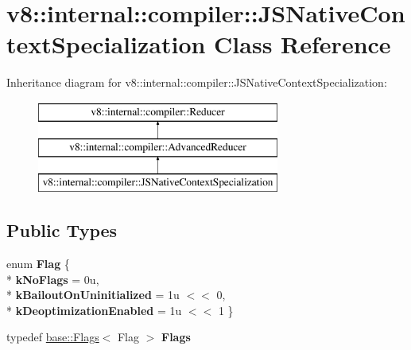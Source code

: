 \hypertarget{classv8_1_1internal_1_1compiler_1_1_j_s_native_context_specialization}{}\section{v8\+:\+:internal\+:\+:compiler\+:\+:J\+S\+Native\+Context\+Specialization Class Reference}
\label{classv8_1_1internal_1_1compiler_1_1_j_s_native_context_specialization}
Inheritance diagram for v8\+:\+:internal\+:\+:compiler\+:\+:J\+S\+Native\+Context\+Specialization\+:\begin{figure}[H]
\begin{center}
\leavevmode
\includegraphics[height=3.000000cm]{classv8_1_1internal_1_1compiler_1_1_j_s_native_context_specialization}
\end{center}
\end{figure}
\subsection*{Public Types}
\begin{DoxyCompactItemize}
\item 
enum {\bfseries Flag} \{ \\*
{\bfseries k\+No\+Flags} = 0u, 
\\*
{\bfseries k\+Bailout\+On\+Uninitialized} = 1u $<$$<$ 0, 
\\*
{\bfseries k\+Deoptimization\+Enabled} = 1u $<$$<$ 1
 \}\hypertarget{classv8_1_1internal_1_1compiler_1_1_j_s_native_context_specialization_ac5300a26368d26f68369e3cacc6d6cc8}{}\label{classv8_1_1internal_1_1compiler_1_1_j_s_native_context_specialization_ac5300a26368d26f68369e3cacc6d6cc8}

\item 
typedef \hyperlink{classv8_1_1base_1_1_flags}{base\+::\+Flags}$<$ Flag $>$ {\bfseries Flags}\hypertarget{classv8_1_1internal_1_1compiler_1_1_j_s_native_context_specialization_a8bf4c1fac7e619700be7c15cfa75be9e}{}\label{classv8_1_1internal_1_1compiler_1_1_j_s_native_context_specialization_a8bf4c1fac7e619700be7c15cfa75be9e}

\end{DoxyCompactItemize}
